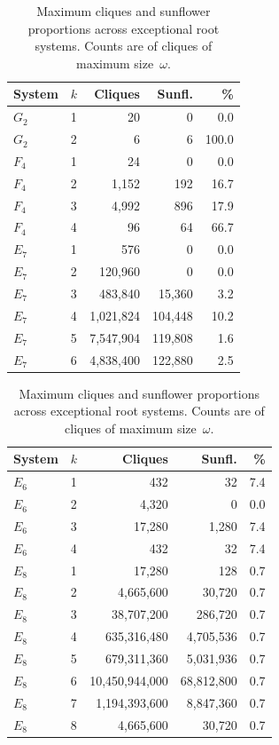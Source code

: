 \documentclass[11pt]{article}
\begin{document}
\begin{table}[ht]
\centering
\begin{minipage}{0.48\textwidth}
\centering
\begin{tabular}{llrrr}
\toprule
System & $k$ & Cliques & Sunfl. & \% \\
\midrule
$G_2$ & 1 & 20 & 0 & 0.0 \\
$G_2$ & 2 & 6 & 6 & 100.0 \\
\midrule
$F_4$ & 1 & 24 & 0 & 0.0 \\
$F_4$ & 2 & 1,152 & 192 & 16.7 \\
$F_4$ & 3 & 4,992 & 896 & 17.9 \\
$F_4$ & 4 & 96 & 64 & 66.7 \\
\midrule
$E_7$ & 1 & 576 & 0 & 0.0 \\
$E_7$ & 2 & 120,960 & 0 & 0.0 \\
$E_7$ & 3 & 483,840 & 15,360 & 3.2 \\
$E_7$ & 4 & 1,021,824 & 104,448 & 10.2 \\
$E_7$ & 5 & 7,547,904 & 119,808 & 1.6 \\
$E_7$ & 6 & 4,838,400 & 122,880 & 2.5 \\
\bottomrule
\end{tabular}
\end{minipage}\hfill
\begin{minipage}{0.48\textwidth}
\centering
\begin{tabular}{llrrr}
\toprule
System & $k$ & Cliques & Sunfl. & \% \\
\midrule
\midrule
$E_6$ & 1 & 432 & 32 & 7.4 \\
$E_6$ & 2 & 4,320 & 0 & 0.0 \\
$E_6$ & 3 & 17,280 & 1,280 & 7.4 \\
$E_6$ & 4 & 432 & 32 & 7.4 \\

\midrule
$E_8$ & 1 & 17,280 & 128 & 0.7 \\
$E_8$ & 2 & 4,665,600 & 30,720 & 0.7 \\
$E_8$ & 3 & 38,707,200 & 286,720 & 0.7 \\
$E_8$ & 4 & 635,316,480 & 4,705,536 & 0.7 \\
$E_8$ & 5 & 679,311,360 & 5,031,936 & 0.7 \\
$E_8$ & 6 & 10,450,944,000 & 68,812,800 & 0.7 \\
$E_8$ & 7 & 1,194,393,600 & 8,847,360 & 0.7 \\
$E_8$ & 8 & 4,665,600 & 30,720 & 0.7 \\
\bottomrule
\end{tabular}
\end{minipage}
\caption{Maximum cliques and sunflower proportions across exceptional root systems. Counts are of cliques of maximum size~$\omega$.}
\label{tab:sunflower}
\end{table}
\end{document}
